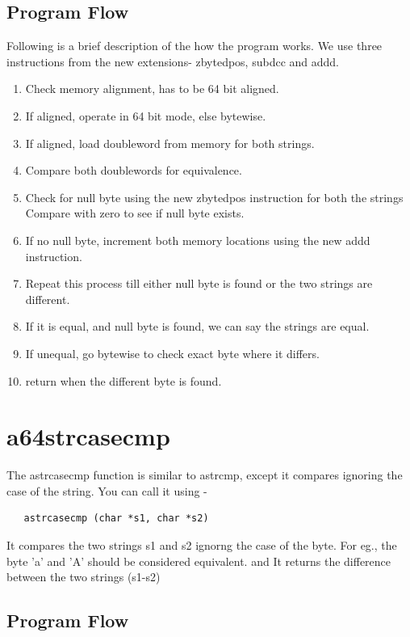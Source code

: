 \documentclass[12pt]{article}
\begin{document}
\subsection{Program Flow}

Following is a brief description of the how the program works. We use three instructions from the new extensions- zbytedpos, subdcc and addd. 


\begin{enumerate}
   \item Check memory alignment, has to be 64 bit aligned.
    \item If aligned, operate in 64 bit mode, else bytewise.
    \item If aligned, load doubleword from memory for both strings.
    \item Compare both doublewords for equivalence.
    \item Check for null byte using the new zbytedpos instruction for both the strings Compare with zero to see if null byte exists.
    \item If no null byte, increment both memory locations using the new addd instruction.
    \item Repeat this process till either null byte is found or the two strings are different.
    \item If it is equal, and null byte is found, we can say the strings are equal.
    \item If unequal, go bytewise to check exact byte where it differs.
    \item return when the different byte is found.
\end{enumerate}

\section{a64strcasecmp}
The astrcasecmp function is similar to astrcmp, except it compares ignoring the case of the string. You can call it using -

\begin{verbatim}
   astrcasecmp (char *s1, char *s2)  
\end{verbatim}

It compares the two strings s1 and s2 ignorng the case of the byte. For eg., the byte 'a' and 'A' should be considered equivalent. and It returns the difference between the two strings (s1-s2)



\subsection{Program Flow}
\end{document}
